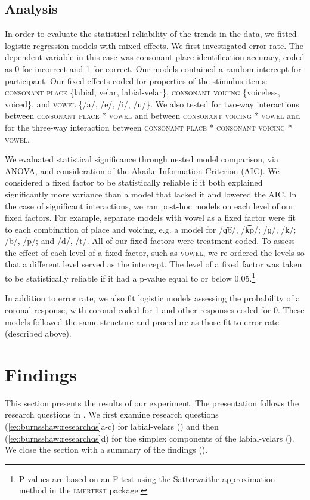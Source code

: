 \documentclass[output=paper,colorlinks,citecolor=brown
]{langscibook}
\begin{document}
\subsection{Analysis}\label{sec:burnsshaw:Analysis}
In order to evaluate the statistical reliability of the trends in the data, we fitted logistic regression models with mixed effects. We first investigated error rate. The dependent variable in this case was consonant place identification accuracy, coded as 0 for incorrect and 1 for correct. Our models contained a random intercept for participant. Our fixed effects coded for properties of the stimulus items: \textsc{consonant place} \{labial, velar, labial-velar\}, \textsc{consonant voicing} \{voiceless, voiced\}, and \textsc{vowel} \{/a/, /e/, /i/, /u/\}. We also tested for two-way interactions between \textsc{consonant place} * \textsc{vowel} and between \textsc{consonant voicing} * \textsc{vowel} and for the three-way interaction between \textsc{consonant place} * \textsc{consonant voicing} * \textsc{vowel}.

We evaluated statistical significance through nested model comparison, via ANOVA, and consideration of the Akaike Information Criterion (AIC). We considered a fixed factor to be statistically reliable if it both explained significantly more variance than a model that lacked it and lowered the AIC. In the case of significant interactions, we ran post-hoc models on each level of our fixed factors. For example, separate models with vowel as a fixed factor were fit to each combination of place and voicing, e.g. a model for  /ɡ͡b/, /k͡p/; /ɡ/, /k/; /b/, /p/; and /d/, /t/. All of our fixed factors were treatment-coded. To assess the effect of each level of a fixed factor, such as \textsc{vowel}, we re-ordered the levels so that a different level served as the intercept. The level of a fixed factor was taken to be statistically reliable if it had a p-value equal to or below 0.05.\footnote{P-values are based on an F-test using the Satterwaithe approximation method in the \textsc{lmertest} package.}

In addition to error rate, we also fit logistic models assessing the probability of a coronal response, with coronal coded for 1 and other responses coded for 0. These models followed the same structure and procedure as those fit to error rate (described above). 

\section{Findings}\label{sec:burnsshaw:Findings}
This section presents the results of our experiment. The presentation follows the research questions in . We first examine research questions (\ref{ex:burnsshaw:researchqs}a-c) for labial-velars () and then (\ref{ex:burnsshaw:researchqs}d) for the simplex components of the labial-velars (). We close the section with a summary of the findings ().
\end{document}
